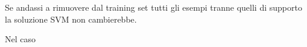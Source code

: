 \documentclass[\main/main.tex]{subfiles}
\begin{document}
\begin{multicols}{2}
\begin{observation}
    Se andassi a rimuovere dal training set tutti gli esempi tranne quelli di supporto la soluzione SVM non cambierebbe.
\end{observation}
\begin{definition}
    Nel caso 
\end{definition}
\end{multicols}
\end{document}
